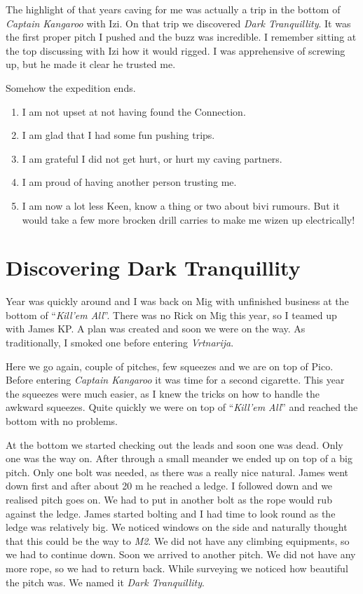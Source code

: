 The highlight of that years caving for me was actually a trip in the
bottom of \emph{Captain Kangaroo} with Izi. On that trip we discovered
\emph{Dark Tranquillity}. It was the first proper pitch I pushed and the
buzz was incredible. I remember sitting at the top discussing with Izi
how it would rigged. I was apprehensive of screwing up, but he made it
clear he trusted me.

Somehow the expedition ends.

\begin{enumerate}
\def\labelenumi{\arabic{enumi}.}
\tightlist
\item
  I am not upset at not having found the Connection.
\item
  I am glad that I had some fun pushing trips.
\item
  I am grateful I did not get hurt, or hurt my caving partners.
\item
  I am proud of having another person trusting me.
\item
  I am now a lot less Keen, know a thing or two about bivi rumours. But
  it would take a few more brocken drill carries to make me wizen up
  electrically!
\end{enumerate}


\hypertarget{discovering-dark-tranquillity}{%
\section{Discovering Dark
Tranquillity}\label{discovering-dark-tranquillity}}

Year was quickly around and I was back on Mig with unfinished business
at the bottom of ``\emph{Kill'em All}''. There was no Rick on Mig this
year, so I teamed up with James KP. A plan was created and soon we were
on the way. As traditionally, I smoked one before entering
\emph{Vrtnarija}.

Here we go again, couple of pitches, few squeezes and we are on top of
Pico. Before entering \emph{Captain Kangaroo} it was time for a second
cigarette. This year the squeezes were much easier, as I knew the tricks
on how to handle the awkward squeezes. Quite quickly we were on top of
``\emph{Kill'em All}'' and reached the bottom with no problems.

At the bottom we started checking out the leads and soon one was dead.
Only one was the way on. After through a small meander we ended up on
top of a big pitch. Only one bolt was needed, as there was a really nice
natural. James went down first and after about 20 m he reached a ledge.
I followed down and we realised pitch goes on. We had to put in another
bolt as the rope would rub against the ledge. James started bolting and
I had time to look round as the ledge was relatively big. We noticed
windows on the side and naturally thought that this could be the way to
\emph{M2}. We did not have any climbing equipments, so we had to
continue down. Soon we arrived to another pitch. We did not have any
more rope, so we had to return back. While surveying we noticed how
beautiful the pitch was. We named it \emph{Dark Tranquillity}.

